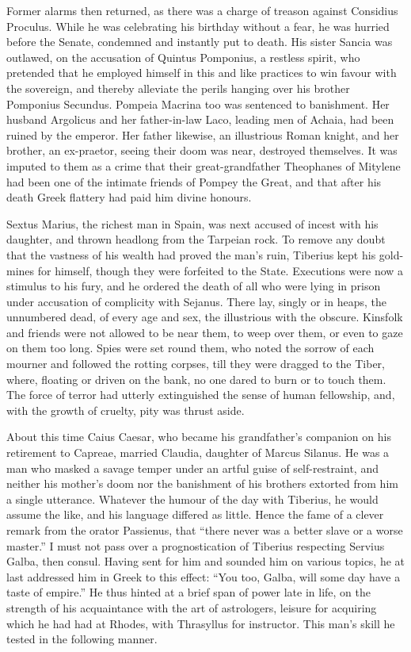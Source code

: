 
Former alarms then returned, as there was a charge of treason against Considius Proculus. While he was celebrating his birthday without a fear, he was hurried before the Senate, condemned and instantly put to death. His sister Sancia was outlawed, on the accusation of Quintus Pomponius, a restless spirit, who pretended that he employed himself in this and like practices to win favour with the sovereign, and thereby alleviate the perils hanging over his brother Pomponius Secundus. Pompeia Macrina too was sentenced to banishment. Her husband Argolicus and her father-in-law Laco, leading men of Achaia, had been ruined by the emperor. Her father likewise, an illustrious Roman knight, and her brother, an ex-praetor, seeing their doom was near, destroyed themselves. It was imputed to them as a crime that their great-grandfather Theophanes of Mitylene had been one of the intimate friends of Pompey the Great, and that after his death Greek flattery had paid him divine honours.


Sextus Marius, the richest man in Spain, was next accused of incest with his daughter, and thrown headlong from the Tarpeian rock. To remove any doubt that the vastness of his wealth had proved the man's ruin, Tiberius kept his gold-mines for himself, though they were forfeited to the State. Executions were now a stimulus to his fury, and he ordered the death of all who were lying in prison under accusation of complicity with Sejanus. There lay, singly or in heaps, the unnumbered dead, of every age and sex, the illustrious with the obscure. Kinsfolk and friends were not allowed to be near them, to weep over them, or even to gaze on them too long. Spies were set round them, who noted the sorrow of each mourner and followed the rotting corpses, till they were dragged to the Tiber, where, floating or driven on the bank, no one dared to burn or to touch them. The force of terror had utterly extinguished the sense of human fellowship, and, with the growth of cruelty, pity was thrust aside.


About this time Caius Caesar, who became his grandfather's companion on his retirement to Capreae, married Claudia, daughter of Marcus Silanus. He was a man who masked a savage temper under an artful guise of self-restraint, and neither his mother's doom nor the banishment of his brothers extorted from him a single utterance. Whatever the humour of the day with Tiberius, he would assume the like, and his language differed as little. Hence the fame of a clever remark from the orator Passienus, that ``there never was a better slave or a worse master.'' I must not pass over a prognostication of Tiberius respecting Servius Galba, then consul. Having sent for him and sounded him on various topics, he at last addressed him in Greek to this effect: ``You too, Galba, will some day have a taste of empire.'' He thus hinted at a brief span of power late in life, on the strength of his acquaintance with the art of astrologers, leisure for acquiring which he had had at Rhodes, with Thrasyllus for instructor. This man's skill he tested in the following manner.

